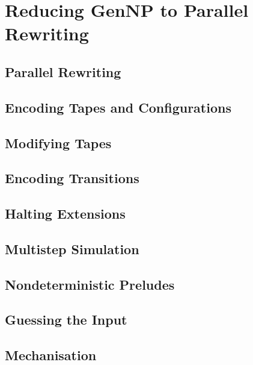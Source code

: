 \chapter{Reducing GenNP to Parallel Rewriting}\label{chap:gennp_pr}

\section{Parallel Rewriting}


\section{Encoding Tapes and Configurations}

\section{Modifying Tapes}

\section{Encoding Transitions}

\section{Halting Extensions}

\section{Multistep Simulation}

\section{Nondeterministic Preludes}

\section{Guessing the Input}

\section{Mechanisation}
